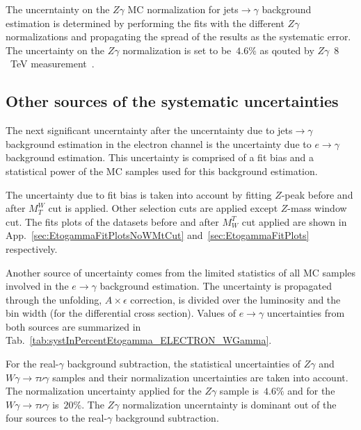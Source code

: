 The uncerntainty on the $Z\gamma$ MC normalization for jets$\rightarrow\gamma$ background estimation is determined by performing the fits with the different $Z\gamma$ normalizations and propagating the spread of the results as the systematic error. The uncertainty on the $Z\gamma$ normalization is set to be~$4.6\%$ as qouted by $Z\gamma$~$8$~TeV measurement~\cite{ref_Zg8TeV}.

\subsection{Other sources of the systematic uncertainties}
\label{sec:Systematics_OtherSources}

The next significant uncerntainty after the uncerntainty due to jets$\rightarrow\gamma$ background estimation in the electron channel is the uncertainty due to $e\rightarrow\gamma$ background estimation. This uncertainty is comprised of a fit bias and a statistical power of the MC samples used for this background estimation. 

The uncertainty due to fit bias is taken into account by fitting $Z$-peak before and after $M_T^W$ cut is applied. Other selection cuts are applied except $Z$-mass window cut. The fits plots of the datasets before and after $M_W^T$ cut applied are shown in App.~\ref{sec:EtogammaFitPlotsNoWMtCut} and~\ref{sec:EtogammaFitPlots} respectively.

Another source of uncertainty comes from the limited statistics of all MC samples involved in the $e\rightarrow\gamma$ background estimation. The uncertainty is propagated through the unfolding, $A \times \epsilon$ correction, is divided over the luminosity and the bin width (for the differential cross section). Values of $e\rightarrow\gamma$ uncertainties from both sources are summarized in Tab.~\ref{tab:systInPercentEtogamma_ELECTRON_WGamma}.


For the real-$\gamma$ background subtraction, the statistical uncertainties of $Z\gamma$ and $W\gamma\rightarrow\tau\nu\gamma$ samples and their normalization uncertainties are taken into account. The normalization uncertainty applied for the $Z\gamma$ sample is~$4.6\%$ and for the $W\gamma\rightarrow\tau\nu\gamma$ is~$20\%$. The $Z\gamma$ normalization uncerntainty is dominant out of the four sources to the real-$\gamma$ background subtraction.


